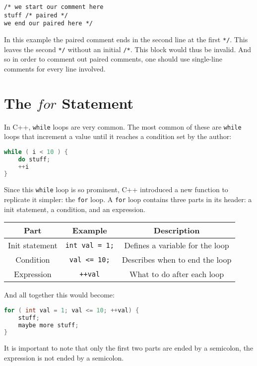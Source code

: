 \documentclass[12pt, a4paper]{report}
\begin{document}
\begin{flushleft}
\noindent \verb|/* we start our comment here| \\
\verb|stuff /* paired */| \\
\verb|we end our paired here */| \\
\end{flushleft}

\noindent In this example the paired comment ends in the second line at the first \verb|*/|. This leaves the second \verb|*/| without an initial \verb|/*|.
This block would thus be invalid. And so in order to comment out paired comments, one should use single-line comments for every line involved.
\section{The $for$ Statement}
In C++, \verb|while| loops are very common. The most common of these are \verb|while| loops that increment a value until it reaches a condition set by the author:

\begin{lstlisting}[language=C++]
while ( i < 10 ) {
	do stuff;
	++i
}
\end{lstlisting}

\noindent Since this \verb|while| loop is so prominent, C++ introduced a new function to replicate it simpler: the \verb|for| loop.
A \verb|for| loop contains three parts in its header: a init statement, a condition, and an expression.

\begin{center}
	\begin{tabular}{ |c|c|c| }
		\hline
		\textbf{Part} & \textbf{Example} & \textbf{Description} \\
		\hline
		Init statement & \verb|int val = 1;| & Defines a variable for the loop \\
		\hline
		Condition & \verb|val <= 10;| & Describes when to end the loop \\
		\hline
		Expression & \verb|++val| & What to do after each loop \\
		\hline
	\end{tabular}
\end{center}
And all together this would become:
\begin{lstlisting}[language=C++]
for ( int val = 1; val <= 10; ++val) {
	stuff;
	maybe more stuff;
}
\end{lstlisting}
It is important to note that only the first two parts are ended by a semicolon, the expression is not ended by a semicolon. 
\end{document}
